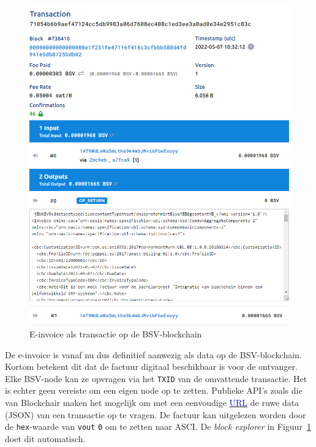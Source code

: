 \begin{figure}[H]
	\centering
	\includegraphics[width=\linewidth]{img/proof-of-concept/factuur-transactie.png}
	\caption{\label{fig:factuur-transactie}E-invoice als transactie op de BSV-blockchain}
\end{figure}

De e-invoice is vanaf nu dus definitief aanwezig als data op de BSV-blockchain. Kortom betekent dit dat de factuur digitaal beschikbaar is voor de ontvanger. Elke BSV-node kan ze opvragen via het \verb*|TXID| van de omvattende transactie. Het is echter geen vereiste om een eigen node op te zetten. Publieke API's zoals die van Blockchair maken het mogelijk om met een eenvoudige \href{https://api.blockchair.com/bitcoin-sv/raw/transaction/031fcc00b88fcc2252107be98c085eea528c470df9d910387947f60adae80287}{\textcolor{blue}{URL}} de ruwe data (JSON) van een transactie op te vragen. De factuur kan uitgelezen worden door de \verb*|hex|-waarde van \verb*|vout| \verb*|0| om te zetten naar ASCI. De \textit{block explorer} in Figuur~\ref{fig:factuur-transactie} doet dit automatisch.


